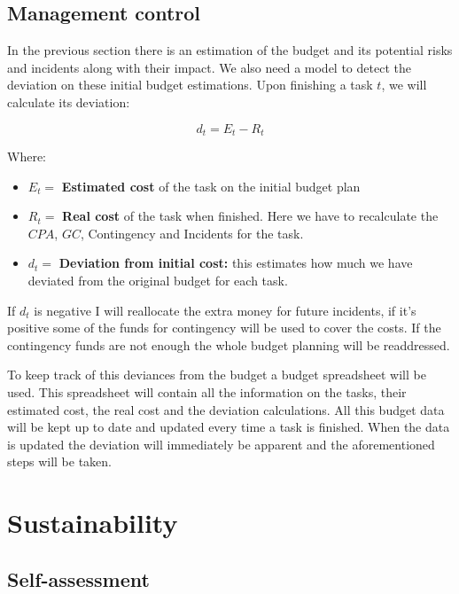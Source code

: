 \pagebreak
\subsection{Management control}

In the previous section there is an estimation of the budget and its potential risks and
incidents along with their impact. We also need a model to detect the
deviation on these initial budget estimations. Upon finishing a task $t$, we will
calculate its deviation:

\begin{equation}
    d_t = E_t - R_t
\end{equation}

Where:

\begin{itemize}
    \item $E_t = $ \textbf{Estimated cost} of the task on the initial budget
        plan
    \item $R_t = $ \textbf{Real cost} of the task when finished. Here we have to
        recalculate the $CPA$, $GC$, Contingency and Incidents for the task.
    \item $d_t = $ \textbf{Deviation from initial cost:} this estimates how much
        we have deviated from the original budget for each task.
\end{itemize}

If $d_t$ is negative I will reallocate the extra money for future incidents, if
it's positive some of the funds for contingency will be used to cover the costs.
If the contingency funds are not enough the whole budget planning will be
readdressed.

To keep track of this deviances from the budget a budget spreadsheet will be
used. This spreadsheet will contain all the information on the tasks, their
estimated cost, the real cost and the deviation calculations. All this budget
data will be kept up to date and updated every time a task is finished. When the
data is updated the deviation will immediately be apparent and the
aforementioned steps will be taken.

\pagebreak
\section{Sustainability}%
\label{sec:sustainability}

\subsection{Self-assessment}

